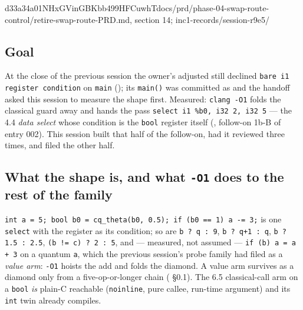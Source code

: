 %
  {d33a34a}{01NHxGVinGBKbb499HFCuwhT}{docs/prd/phase-04-swap-route-control/retire-swap-route-PRD.md, section 14; inc1-records/session-r9e5/}

\subsection*{Goal}
At the close of the previous session the owner's adjusted
 still declined \texttt{bare i1 register condition}
on \texttt{main} (); its \texttt{main()} was committed as
 and the handoff asked this
session to measure the shape first. Measured: \texttt{clang -O1} folds the classical guard away and
hands the pass \texttt{select i1 \%b0, i32 2, i32 5} --- the 4.4 \emph{data select} whose condition
is the \texttt{bool} register itself (, follow-on 1b-B of entry 002). This session built
that half of the follow-on, had it reviewed three times, and filed the other half.

\subsection*{What the shape is, and what \texttt{-O1} does to the rest of the family}
\texttt{int a = 5; bool b0 = cq\_theta(b0, 0.5); if (b0 == 1) a -= 3;} is one \texttt{select} with
the register as its condition; so are \texttt{b ? q : 9}, \texttt{b ? q+1 : q}, \texttt{b ? 1.5 : 2.5},
\texttt{(b != c) ? 2 : 5}, and --- measured, not assumed --- \texttt{if (b) a = a + 3} on a quantum
\texttt{a}, which the previous session's probe family had filed as a \emph{value arm}: \texttt{-O1}
hoists the add and folds the diamond. A value arm survives as a diamond only from a five-op-or-longer
chain ( \S0.1). The 6.5 classical-call arm on a
\texttt{bool} \emph{is} plain-C reachable (\texttt{noinline}, pure callee, run-time argument) and its
\texttt{int} twin already compiles.

